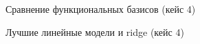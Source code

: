 \begin{table}[H]
    \centering
    \caption{Сравнение функциональных базисов (кейс 4)}
    
\end{table}
\begin{table}[H]
    \centering
    \caption{Лучшие линейные модели и ridge (кейс 4)}
    
\end{table}
